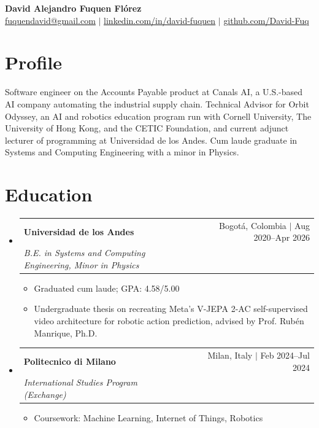 \documentclass[letterpaper,11pt]{article}
\makeatletter
\newcommand{\resumeItem}[1]{\item\small{#1\vspace{-2pt}}}
\newcommand{\resumeSubheading}[3]{
  \vspace{-2pt}\item
  \begin{tabular*}{0.97\textwidth}[t]{l@{\extracolsep{\fill}}r}
    \textbf{#1} & #2 \\
    \textit{\small#3} & \\
  \end{tabular*}\vspace{-7pt}
}
\newcommand{\resumeSubHeadingListStart}{\begin{itemize}[leftmargin=0.15in, label={}]}
\newcommand{\resumeSubHeadingListEnd}{\end{itemize}}
\newcommand{\resumeItemListStart}{\begin{itemize}[leftmargin=0.15in, itemsep=0pt]}
\newcommand{\resumeItemListEnd}{\end{itemize}\vspace{-5pt}}
\makeatother
\begin{document}
\begin{center}
  {\Huge \textbf{David Alejandro Fuquen Flórez}} \\ \vspace{3pt}
  \small
  \href{mailto:fuquendavid@gmail.com}{\underline{fuquendavid@gmail.com}} $|$
  \href{https://linkedin.com/in/david-fuquen}{\underline{linkedin.com/in/david-fuquen}} $|$
  \href{https://github.com/David-Fuq}{\underline{github.com/David-Fuq}}
\end{center}

\section{Profile}
\small{
Software engineer on the Accounts Payable product at Canals AI, a U.S.-based AI
company automating the industrial supply chain. Technical Advisor for Orbit
Odyssey, an AI and robotics education program run with Cornell University, The
University of Hong Kong, and the CETIC Foundation, and current adjunct lecturer
of programming at Universidad de los Andes. Cum laude graduate in Systems and
Computing Engineering with a minor in Physics.
}

\section{Education}
\resumeSubHeadingListStart

  \resumeSubheading
    {Universidad de los Andes}{Bogotá, Colombia $|$ Aug 2020--Apr 2026}
    {B.E. in Systems and Computing Engineering, Minor in Physics}
  \resumeItemListStart
    \resumeItem{Graduated cum laude; GPA: 4.58/5.00}
    \resumeItem{Undergraduate thesis on recreating Meta's V-JEPA 2-AC self-supervised video architecture for robotic action prediction, advised by Prof. Rubén Manrique, Ph.D.}
  \resumeItemListEnd

  \resumeSubheading
    {Politecnico di Milano}{Milan, Italy $|$ Feb 2024--Jul 2024}
    {International Studies Program (Exchange)}
  \resumeItemListStart
    \resumeItem{Coursework: Machine Learning, Internet of Things, Robotics}
  \resumeItemListEnd

\resumeSubHeadingListEnd

\end{document}
